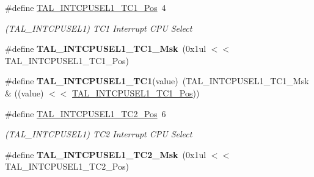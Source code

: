 \begin{DoxyCompactItemize}
\item 
\hypertarget{group___s_a_m_l21___t_a_l_gad84dc57e4de68c55d93536183f96ea56}{}\#define \hyperlink{group___s_a_m_l21___t_a_l_gad84dc57e4de68c55d93536183f96ea56}{T\+A\+L\+\_\+\+I\+N\+T\+C\+P\+U\+S\+E\+L1\+\_\+\+T\+C1\+\_\+\+Pos}~4\label{group___s_a_m_l21___t_a_l_gad84dc57e4de68c55d93536183f96ea56}

\begin{DoxyCompactList}\small\item\em (T\+A\+L\+\_\+\+I\+N\+T\+C\+P\+U\+S\+E\+L1) T\+C1 Interrupt C\+P\+U Select \end{DoxyCompactList}\item 
\hypertarget{group___s_a_m_l21___t_a_l_gae48f278f05d3c95fdb3d3504782027a5}{}\#define {\bfseries T\+A\+L\+\_\+\+I\+N\+T\+C\+P\+U\+S\+E\+L1\+\_\+\+T\+C1\+\_\+\+Msk}~(0x1ul $<$$<$ T\+A\+L\+\_\+\+I\+N\+T\+C\+P\+U\+S\+E\+L1\+\_\+\+T\+C1\+\_\+\+Pos)\label{group___s_a_m_l21___t_a_l_gae48f278f05d3c95fdb3d3504782027a5}

\item 
\hypertarget{group___s_a_m_l21___t_a_l_gad4bb38e9cdc28ae26791c1df63867004}{}\#define {\bfseries T\+A\+L\+\_\+\+I\+N\+T\+C\+P\+U\+S\+E\+L1\+\_\+\+T\+C1}(value)~(T\+A\+L\+\_\+\+I\+N\+T\+C\+P\+U\+S\+E\+L1\+\_\+\+T\+C1\+\_\+\+Msk \& ((value) $<$$<$ \hyperlink{group___s_a_m_l21___t_a_l_gad84dc57e4de68c55d93536183f96ea56}{T\+A\+L\+\_\+\+I\+N\+T\+C\+P\+U\+S\+E\+L1\+\_\+\+T\+C1\+\_\+\+Pos}))\label{group___s_a_m_l21___t_a_l_gad4bb38e9cdc28ae26791c1df63867004}

\item 
\hypertarget{group___s_a_m_l21___t_a_l_gac9d7a1126dbf287f67473b723c5205c6}{}\#define \hyperlink{group___s_a_m_l21___t_a_l_gac9d7a1126dbf287f67473b723c5205c6}{T\+A\+L\+\_\+\+I\+N\+T\+C\+P\+U\+S\+E\+L1\+\_\+\+T\+C2\+\_\+\+Pos}~6\label{group___s_a_m_l21___t_a_l_gac9d7a1126dbf287f67473b723c5205c6}

\begin{DoxyCompactList}\small\item\em (T\+A\+L\+\_\+\+I\+N\+T\+C\+P\+U\+S\+E\+L1) T\+C2 Interrupt C\+P\+U Select \end{DoxyCompactList}\item 
\hypertarget{group___s_a_m_l21___t_a_l_gab101cee12bce2784d17b3bff082410fd}{}\#define {\bfseries T\+A\+L\+\_\+\+I\+N\+T\+C\+P\+U\+S\+E\+L1\+\_\+\+T\+C2\+\_\+\+Msk}~(0x1ul $<$$<$ T\+A\+L\+\_\+\+I\+N\+T\+C\+P\+U\+S\+E\+L1\+\_\+\+T\+C2\+\_\+\+Pos)\label{group___s_a_m_l21___t_a_l_gab101cee12bce2784d17b3bff082410fd}


\end{DoxyCompactItemize}
